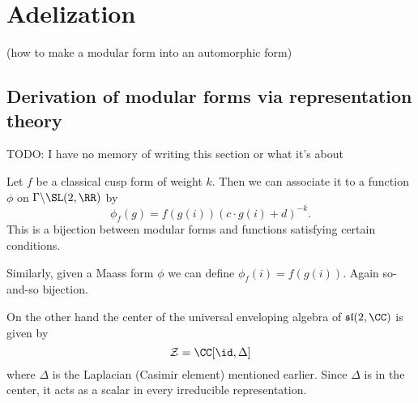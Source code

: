 \chapter{Adelization}
(how to make a modular form into an automorphic form)
\section{Derivation of modular forms via representation theory}
TODO: I have no memory of writing this section or what it's about

Let $f$ be a classical cusp form of weight $k$.
Then we can associate it to a function $\phi$ on $\Gamma \backslash \SL(2, \RR)$ by
\[ \phi_f(g) = f(g(i)) (c \cdot g(i) + d)^{-k}. \]
This is a bijection between modular forms and functions
satisfying certain conditions.

Similarly, given a Maass form $\phi$ we can define $\phi_f(i) = f(g(i))$.
Again so-and-so bijection.

On the other hand the center of the universal enveloping algebra
of $\mathfrak{sl}(2,\CC)$ is given by
\[ \mathcal Z = \CC[\id, \Delta] \]
where $\Delta$ is the Laplacian (Casimir element) mentioned earlier.
Since $\Delta$ is in the center, it acts as a scalar in every irreducible representation.

